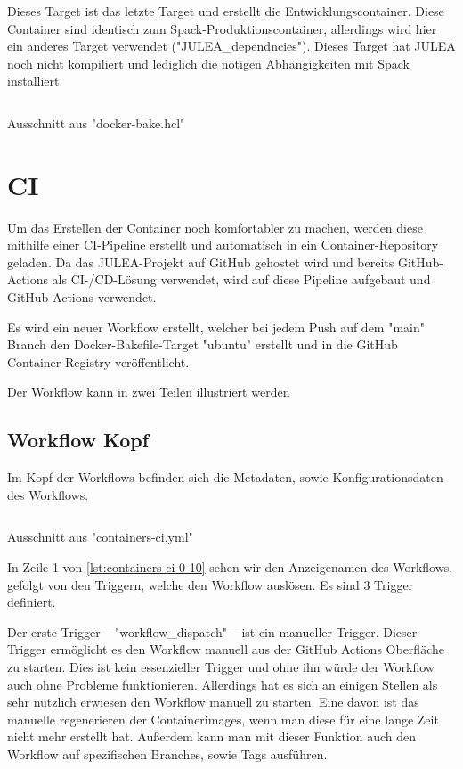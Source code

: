 Dieses Target ist das letzte Target und erstellt die Entwicklungscontainer. Diese Container sind identisch zum Spack-Produktionscontainer, allerdings wird hier ein anderes Target verwendet ("JULEA\_dependncies"). Dieses Target hat JULEA noch nicht kompiliert und lediglich die nötigen Abhängigkeiten mit Spack installiert.

\begin{listing}[H]
    \inputminted[firstline=64]{./lexers/docker-bake-lexer.py}{./code-examples/docker-bake.hcl}
    \caption{Ausschnitt aus "docker-bake.hcl"}
\end{listing}

\section{CI}

Um das Erstellen der Container noch komfortabler zu machen, werden diese mithilfe einer CI-Pipeline erstellt und automatisch in ein Container-Repository geladen. Da das JULEA-Projekt auf GitHub gehostet wird und bereits GitHub-Actions als CI-/CD-Lösung verwendet, wird auf diese Pipeline aufgebaut und GitHub-Actions verwendet.

Es wird ein neuer Workflow erstellt, welcher bei jedem Push auf dem "main" Branch den Docker-Bakefile-Target "ubuntu" erstellt und in die GitHub Container-Registry veröffentlicht.

Der Workflow kann in zwei Teilen illustriert werden 

\subsection{Workflow Kopf}

Im Kopf der Workflows befinden sich die Metadaten, sowie Konfigurationsdaten des Workflows.

\begin{listing}[H]
    \inputminted[firstline=0,lastline=10]{yaml}{./code-examples/containers-ci.yml}
    \caption{Ausschnitt aus "containers-ci.yml"}
    \label{lst:containers-ci-0-10}
\end{listing}

In Zeile 1 von \cref{lst:containers-ci-0-10} sehen wir den Anzeigenamen des Workflows, gefolgt von den Triggern, welche den Workflow auslösen. Es sind 3 Trigger definiert. 

Der erste Trigger – "workflow\_dispatch" – ist ein manueller Trigger. Dieser Trigger ermöglicht es den Workflow manuell aus der GitHub Actions Oberfläche zu starten. Dies ist kein essenzieller Trigger und ohne ihn würde der Workflow auch ohne Probleme funktionieren. Allerdings hat es sich an einigen Stellen als sehr nützlich erwiesen den Workflow manuell zu starten. Eine davon ist das manuelle regenerieren der Containerimages, wenn man diese für eine lange Zeit nicht mehr erstellt hat. Außerdem kann man mit dieser Funktion auch den Workflow auf spezifischen Branches, sowie Tags ausführen.

